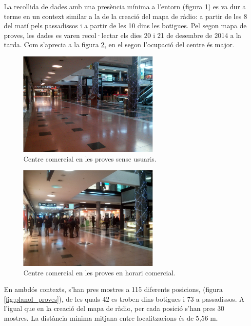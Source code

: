 La recollida de dades amb una presència mínima a l'entorn (figura \ref{fig:foto_buit}) es va dur a terme en un context similar a la de la creació del mapa de ràdio: a partir de les 8 del matí pels passadissos i a partir de les 10 dins les botigues. Pel segon mapa de proves, les dades es varen recol·lectar els dies 20 i 21 de desembre de 2014 a la tarda. Com s'aprecia a la figura \ref{fig:foto_ple}, en el segon l'ocupació del centre és major.

\begin{figure}[ht]
\begin{center}
\includegraphics[width=7cm]{imatges/foto_buit.jpg}
\caption{Centre comercial en les proves sense usuaris.}
\label{fig:foto_buit}
\end{center}
\end{figure}

\begin{figure}[ht]
\begin{center}
\includegraphics[width=7cm]{imatges/foto_ple.jpg}
\caption{Centre comercial en les proves en horari comercial.}
\label{fig:foto_ple}
\end{center}
\end{figure}

En ambdós contexts, s'han pres mostres a 115 diferents posicions, (figura \ref{fig:planol_proves}), de les quals 42 es troben dins botigues i 73 a passadissos. A l'igual que en la creació del mapa de ràdio, per cada posició s'han pres 30 mostres. La distància mínima mitjana entre localitzacions és de 5,56 m.

